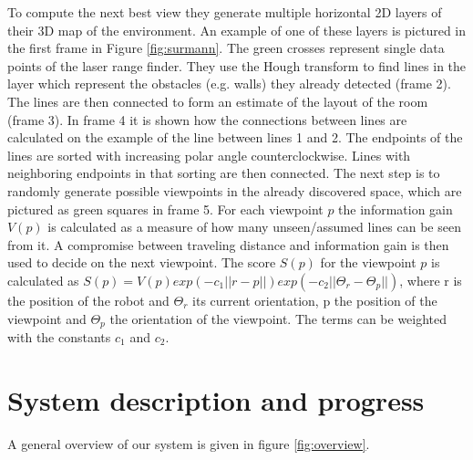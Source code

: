 \documentclass[a4paper,11pt,english]{article}
\begin{document}
To compute the next best view they generate multiple horizontal 2D layers of their 3D map of the environment.
An example of one of these layers is pictured in the first frame in Figure \ref{fig:surmann}.
The green crosses represent single data points of the laser range finder.
They use the Hough transform to find lines in the layer which represent the obstacles (e.g. walls) they already detected (frame 2).
The lines are then connected to form an estimate of the layout of the room (frame 3).
In frame 4 it is shown how the connections between lines are calculated on the example of the line between lines 1 and 2. 
The endpoints of the lines are sorted with increasing polar angle counterclockwise.
Lines with neighboring endpoints in that sorting are then connected.
The next step is to randomly generate possible viewpoints in the already discovered space, which are pictured as green squares in frame 5.
For each viewpoint $p$ the information gain $V(p)$ is calculated as a measure of how many unseen/assumed lines can be seen from it.
A compromise between traveling distance and information gain is then used to decide on the next viewpoint.
The score $S(p)$ for the viewpoint $p$ is calculated as $S(p) = V(p) exp(-c_1||r-p||)exp(-c_2||\Theta_r-\Theta_p||)$, where r is the position of the robot and $\Theta_r$ its current orientation, p the position of the viewpoint and $\Theta_p$ the orientation of the viewpoint. The terms can be weighted with the constants $c_1$ and $c_2$.

\section{System description and progress}
\label{system}
A general overview of our system is given in figure \ref{fig:overview}.
\end{document}
